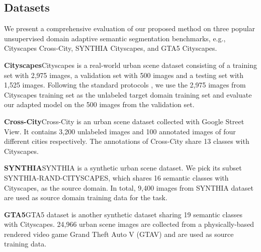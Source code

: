\documentclass[runningheads]{llncs}
\begin{document}
\subsection{Datasets}
We present a comprehensive evaluation of our proposed method on three popular unsupervised domain adaptive semantic segmentation benchmarks, e.g., Cityscapes  Cross-City, SYNTHIA  Cityscapes, and GTA5  Cityscapes.

\noindent\textbf{Cityscapes}\quad Cityscapes \cite{Cordts2016Cityscapes} is a real-world urban scene dataset consisting of a training set with 2,975 images, a validation set with 500 images and a testing set with 1,525 images. Following the standard protocols \cite{hoffman2016fcns, Hoffman_cycada2017, Tsai_adaptseg_2018}, we use the 2,975 images from Cityscapes training set as the unlabeled target domain training set and evaluate our adapted model on the 500 images from the validation set. 

\noindent\textbf{Cross-City}\quad Cross-City \cite{no_more_discrimination} is an urban scene dataset collected with Google Street View. It contains 3,200 unlabeled images and 100 annotated images of four different cities respectively. The annotations of Cross-City share 13 classes with Cityscapes.

\noindent\textbf{SYNTHIA}\quad SYNTHIA \cite{Ros_2016_CVPR_synthia} is a synthetic urban scene dataset. We pick its subset SYNTHIA-RAND-CITYSCAPES, which shares 16 semantic classes with Cityscapes, as the source domain. In total, 9,400 images from SYNTHIA dataset are used as source domain training data for the task.

\noindent\textbf{GTA5}\quad GTA5 dataset \cite{Richter_2016_ECCV_gtav} is another synthetic dataset sharing 19 semantic classes with Cityscapes. 24,966 urban scene images are collected from a physically-based rendered video game Grand Theft Auto V (GTAV) and are used as source training data. 
\end{document}

